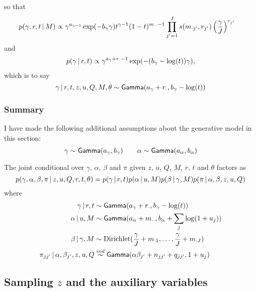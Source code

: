 so that
\begin{align}
  \label{eq:10}
  p(\gamma, r, t \, \vert \, M) &\propto \gamma^{a_{\gamma - 1}}
  \exp(-b_{\gamma}\gamma) t^{\gamma - 1}(1-t)^{m_{\cdot\cdot}  - 1} \prod_{j'=1}^J s(m_{\cdot {j'}}, r_{j'})
  \left(\frac{\gamma}{J}\right)^{r_{j'}}
\end{align}
and
\begin{align}
  \label{eq:11}
  p(\gamma \, \vert \, r, t) \propto \gamma^{a_\gamma +
    r_{\cdot} - 1} \exp(-(b_{\gamma} - \log(t)) \gamma),
\end{align}
which is to say
\begin{equation}
  \label{eq:18}
  \gamma \, \vert \, r, t, z, u, Q, M, \theta \sim \mathsf{Gamma}(a_{\gamma} + r_{\cdot},b_{\gamma} - \log(t))
\end{equation}

\subsubsection{Summary}

I have made the following additional assumptions about the generative
model in this section:
\begin{equation}
  \label{eq:100}
  \gamma \sim \mathsf{Gamma}(a_{\gamma},b_{\gamma}) \qquad \alpha \sim \mathsf{Gamma}(a_{\alpha},b_{\alpha})
\end{equation}

The joint conditional over $\gamma$, $\alpha$, $\beta$ and $\pi$
given $z$, $u$, $Q$, $M$, $r$, $t$ and $\theta$ factors as
\begin{equation}
  \label{eq:46}
  p(\gamma, \alpha, \beta, \pi \, \vert \, z, u, Q, r, t,
  \theta) = p(\gamma \, \vert \, r, t) p(\alpha \, \vert \, u, M) p(\beta
  \, \vert \, \gamma, M) p(\pi \, \vert \, \alpha, \beta, z, u, Q)
\end{equation}
where
\begin{align}
  \label{eq:64}
  \gamma \, \vert \, r, t &\sim \mathsf{Gamma}(a_{\gamma} + r_{\cdot},b_{\gamma} -
    \log(t)) \\
  \alpha \, \vert \, u, M &\sim \mathsf{Gamma}(a_{\alpha} +
    m_{\cdot\cdot},b_{\alpha} + \sum_j \log(1 + u_j)) \\
  \beta \, \vert \, \gamma, M &\sim \mathrm{Dirichlet}(\frac{\gamma}{J} + m_{\cdot 1},
  \dots, \frac{\gamma}{J} + m_{\cdot J}) \\
  \pi_{jj'} \, \vert \, \alpha, \beta_{j'}, z, u, Q
  &\stackrel{ind}{\sim} \mathsf{Gamma}(\alpha\beta_{j'} + n_{jj'} + q_{jj'},1 +
  u_j)
\end{align}


\subsection{Sampling $z$ and the auxiliary variables}
\label{sec:sampling-z_t}

